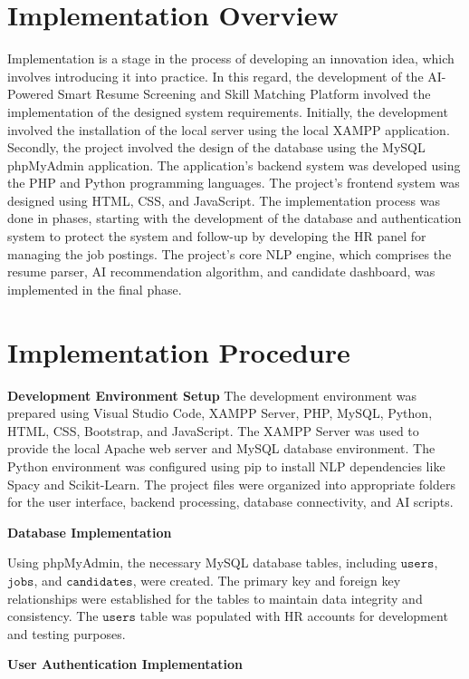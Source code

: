 \documentclass[12pt,a4paper]{report}
\begin{document}
\section{Implementation Overview}
Implementation is a stage in the process of developing an innovation idea, which involves introducing it into practice. In this regard, the development of the AI-Powered Smart Resume Screening and Skill Matching Platform involved the implementation of the designed system requirements. Initially, the development involved the installation of the local server using the local XAMPP application. Secondly, the project involved the design of the database using the MySQL phpMyAdmin application. The application’s backend system was developed using the PHP and Python programming languages. The project’s frontend system was designed using HTML, CSS, and JavaScript. The implementation process was done in phases, starting with the development of the database and authentication system to protect the system and follow-up by developing the HR panel for managing the job postings. The project’s core NLP engine, which comprises the resume parser, AI recommendation algorithm, and candidate dashboard, was implemented in the final phase.

\section{Implementation Procedure}

\textbf{Development Environment Setup}
The development environment was prepared using Visual Studio Code, XAMPP
Server, PHP, MySQL, Python, HTML, CSS, Bootstrap, and JavaScript. The XAMPP Server was used
to provide the local Apache web server and MySQL database environment. The Python environment was configured using pip to install NLP dependencies like Spacy and Scikit-Learn. The project files were organized into appropriate folders for the user interface, backend processing, database connectivity, and AI scripts.

\textbf{Database Implementation}

Using phpMyAdmin, the necessary MySQL database tables, including
$\texttt{users}$, $\texttt{jobs}$, and $\texttt{candidates}$, were created. The primary key and foreign
key relationships were established for the tables to maintain data
integrity and consistency. The $\texttt{users}$ table was populated
with HR accounts for development and testing purposes.

\textbf{User Authentication Implementation}
\end{document}
